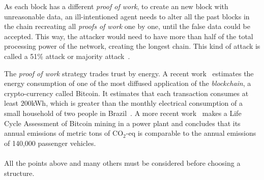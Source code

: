 \documentclass[../main.tex]{subfiles}
\begin{document}
As each block has a different \emph{proof of work}, to create an new block with unreasonable data, an ill-intentioned agent needs to alter all the past blocks in the chain recreating all \emph{proofs of work} one by one, until the false data could be accepted.
This way, the attacker would need to have more than half of the total processing power of the network, creating the longest chain. This kind of attack is called a 51\% attack or majority attack~\cite{CilloniEtAl2020}.

The \emph{proof of work} strategy trades trust by energy.
A recent work~\cite{ColeCheng2018} estimates the energy consumption of one of the most diffused application of the \emph{blockchain}, a crypto-currency called Bitcoin.
It estimates that each transaction consumes at least $200$kWh, which is greater than the monthly electrical consumption of a small household of two people in Brazil~\cite{EPE2022}.
A more recent work~\cite{RoeckDrennen2022} makes a Life Cycle Assessment of Bitcoin mining in a power plant and concludes that its annual emissions of metric tons of CO$_2$-eq is comparable to the annual emissions of 140,000 passenger vehicles.
\\~\\
All the points above and many others must be considered before choosing a structure.


\end{document}
